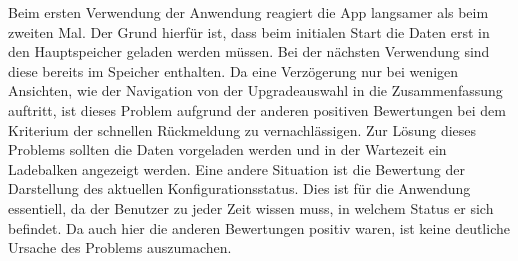 Beim ersten Verwendung der Anwendung reagiert die App langsamer als beim zweiten Mal. Der Grund hierfür ist, dass beim initialen Start die Daten erst in den Hauptspeicher geladen werden müssen. Bei der nächsten Verwendung sind diese bereits im Speicher enthalten. Da eine Verzögerung nur bei wenigen Ansichten, wie der Navigation von der Upgradeauswahl in die Zusammenfassung auftritt, ist dieses Problem aufgrund der anderen positiven Bewertungen bei dem Kriterium der schnellen Rückmeldung zu vernachlässigen. Zur Lösung dieses Problems sollten die Daten vorgeladen werden und in der Wartezeit ein Ladebalken angezeigt werden. Eine andere Situation ist die Bewertung der Darstellung des aktuellen Konfigurationsstatus. Dies ist für die Anwendung essentiell, da der Benutzer zu jeder Zeit wissen muss, in welchem Status er sich befindet. Da auch hier die anderen Bewertungen positiv waren, ist keine deutliche Ursache des Problems auszumachen.

